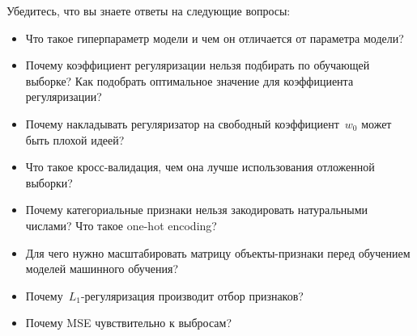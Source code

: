 \documentclass[12pt,a4paper]{article}
\begin{document}
Убедитесь, что вы знаете ответы на следующие вопросы:
\begin{itemize}
	\item Что такое гиперпараметр модели и чем он отличается от параметра модели?
	\item Почему коэффициент регуляризации нельзя подбирать по обучающей выборке? Как подобрать оптимальное значение для коэффициента регуляризации? 
	\item Почему накладывать регуляризатор на свободный коэффициент~$w_0$ может быть плохой идеей?
	\item Что такое кросс-валидация, чем она лучше использования отложенной выборки?
	\item Почему категориальные признаки нельзя закодировать натуральными числами? Что такое one-hot encoding?
	\item Для чего нужно масштабировать матрицу объекты-признаки перед обучением моделей машинного обучения?
	\item Почему~$L_1$-регуляризация производит отбор признаков?
	\item Почему MSE чувствительно к выбросам? 
\end{itemize}
\end{document}
